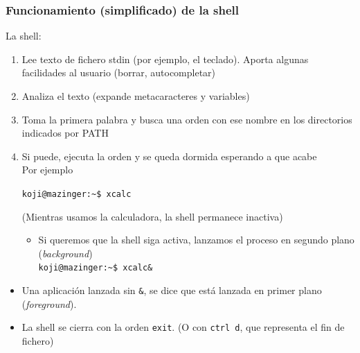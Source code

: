 \documentclass[ucs]{beamer}
\begin{document}
\begin{frame}[fragile]
\frametitle{Funcionamiento (simplificado) de la shell}
La shell:
\begin{enumerate}
\item 
Lee texto de  fichero stdin (por ejemplo, el teclado).
Aporta 
algunas facilidades al usuario (borrar, autocompletar)
\item 
Analiza el texto (expande metacaracteres y variables)
\item 
Toma la primera palabra y busca una orden con ese nombre
en los directorios indicados por PATH

\item
Si puede, 
ejecuta la orden y se queda dormida esperando
a que acabe\\
Por ejemplo

\verb|koji@mazinger:~$ xcalc|

(Mientras usamos la calculadora, la shell permanece inactiva)
\begin{itemize}
\item 
Si queremos que la shell siga activa, 
lanzamos el proceso 
en segundo plano (\emph{background}) \\

\verb|koji@mazinger:~$ xcalc&|

\end{itemize}
\end{enumerate}
\end{frame}


\begin{frame}[fragile]
\begin{itemize}
\item
Una aplicación lanzada sin \verb|&|, se dice que está
lanzada en primer plano (\emph{foreground}).
\item
La shell se cierra con la orden \verb|exit|. (O con \verb|ctrl d|,
 que representa el fin de fichero)
\end{itemize}

\end{frame}
\end{document}
